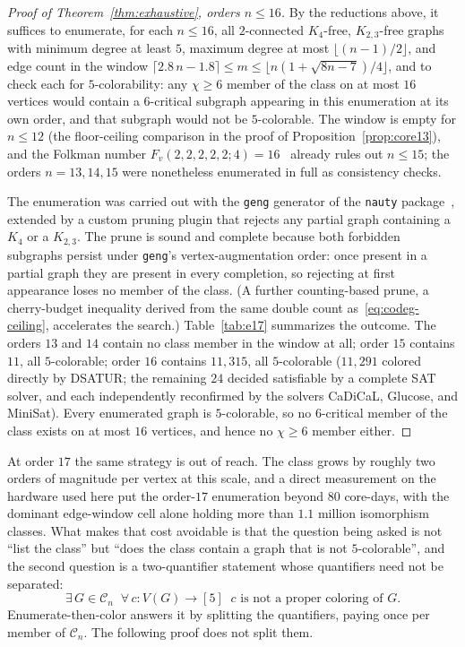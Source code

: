 \documentclass[11pt]{article}
\theoremstyle{definition}
\newcommand{\chrom}{\chi}
\begin{document}
\begin{proof}[Proof of Theorem~\ref{thm:exhaustive}, orders $n \le 16$]
By the reductions above, it suffices to enumerate, for each $n \le 16$, all
$2$-connected $K_4$-free, $K_{2,3}$-free graphs with minimum degree at least
$5$, maximum degree at most $\lfloor (n-1)/2 \rfloor$, and edge count in the
window
$\lceil 2.8\,n - 1.8 \rceil \le m \le \lfloor n(1 + \sqrt{8n-7})/4 \rfloor$,
and to check each for $5$-colorability: any $\chrom \ge 6$ member of the class
on at most $16$ vertices would contain a $6$-critical subgraph appearing in
this enumeration at its own order, and that subgraph would not be
$5$-colorable. The window is empty for $n \le 12$ (the floor-ceiling
comparison in the proof of Proposition~\ref{prop:core13}), and the Folkman
number $F_v(2,2,2,2,2;4) = 16$~\cite{LathropRadziszowski2011} already rules
out $n \le 15$; the orders $n = 13, 14, 15$ were nonetheless enumerated in
full as consistency checks.

The enumeration was carried out with the \texttt{geng} generator of the
\texttt{nauty} package~\cite{McKayPiperno2014}, extended by a custom pruning
plugin that rejects any partial graph containing a $K_4$ or a $K_{2,3}$. The
prune is sound and complete because both forbidden subgraphs persist under
\texttt{geng}'s vertex-augmentation order: once present in a partial graph
they are present in every completion, so rejecting at first appearance loses
no member of the class. (A further counting-based prune, a cherry-budget
inequality derived from the same double count as~\eqref{eq:codeg-ceiling},
accelerates the search.) Table~\ref{tab:e17} summarizes the outcome. The
orders $13$ and $14$ contain no class member in the window at all; order $15$
contains $11$, all $5$-colorable; order $16$ contains $11{,}315$, all
$5$-colorable ($11{,}291$ colored directly by DSATUR; the remaining $24$
decided satisfiable by a complete SAT solver, and each independently
reconfirmed by the solvers CaDiCaL, Glucose, and MiniSat). Every
enumerated graph is $5$-colorable, so no
$6$-critical member of the class exists on at most $16$ vertices, and hence no
$\chrom \ge 6$ member either.
\end{proof}

At order $17$ the same strategy is out of reach. The class grows by roughly two
orders of magnitude per vertex at this scale, and a direct measurement on the
hardware used here put the order-$17$ enumeration beyond $80$ core-days, with the
dominant edge-window cell alone holding more than $1.1$ million isomorphism
classes. What makes that cost avoidable is that the question being asked is not
``list the class'' but ``does the class contain a graph that is not
$5$-colorable'', and the second question is a two-quantifier statement whose
quantifiers need not be separated:
\[
  \exists\, G \in \mathcal{C}_n \;\; \forall\, c : V(G) \to [5]
  \;\; c \text{ is not a proper coloring of } G .
\]
Enumerate-then-color answers it by splitting the quantifiers, paying once per
member of $\mathcal{C}_n$. The following proof does not split them.
\end{document}
